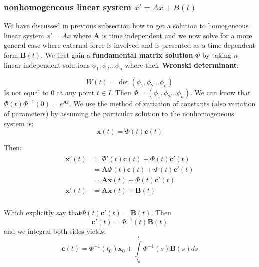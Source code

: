 \documentclass[a4paper]{article}
\begin{document}
\subsubsection{nonhomogeneous linear system $x'=Ax+B(t)$}
We have discussed in previous subsection how to get a solution to homogeneous linear system $x’=Ax$ where $\mathbf{A}$ is time independent and we now solve for a more general case where external force is involved and is presented as a time-dependent form $\mathbf{B}(t)$. We first gain a \textbf{fundamental matrix solution} $\Phi $ by taking $n$ linear independent solutions ${{\phi }_{1}},{{\phi }_{2}}\ldots {{\phi }_{n}}$ where their \textbf{Wronski determinant}:

\[W(t)=\det ({{\phi }_{1}},{{\phi }_{2}}\ldots {{\phi }_{n}})\]
Is not equal to 0 at any point $t\in I$.
Then $\Phi =({{\phi }_{1}},{{\phi }_{2}}\ldots {{\phi }_{n}})$. We can know that $\Phi (t){{\Phi }^{-1}}(0)={{e}^{\mathbf{A}t}}$. We use the method of variation of constants (also variation of parameters) by assuming the particular solution to the nonhomogeneous system is:
\begin{equation}
\mathbf{x}(t)=\Phi (t)\mathbf{c}(t)
\end{equation}

Then:
\begin{eqnarray}     %
\left.                        %
\begin{array}{lll}       %
\mathbf{x}'(t)&=\Phi '(t)\mathbf{c}(t)+\Phi (t)\mathbf{c}'(t) \\
& =\mathbf{A}\Phi (t)\mathbf{c}(t)+\Phi (t)\mathbf{c}'(t) \\
& =\mathbf{Ax}(t)+\Phi (t)\mathbf{c}'(t) \\
\mathbf{x}'(t)&=\mathbf{Ax}(t)+\mathbf{B}(t) \\
\end{array}              %
\right.                       %
\end{eqnarray}

Which explicitly say that$\Phi (t)\mathbf{c}'(t)=\mathbf{B}(t)$. Then \[\mathbf{c}'(t)={{\Phi }^{-1}}(t)\mathbf{B}(t)\]and we integral both sides yields:
\begin{equation}
\mathbf{c}(t)={{\Phi }^{-1}}({{t}_{0}}){{\mathbf{x}}_{0}}+\int\limits_{{{t}_{0}}}^{t}{{{\Phi }^{-1}}(s)\mathbf{B}(s)ds}
\end{equation}
\end{document}
